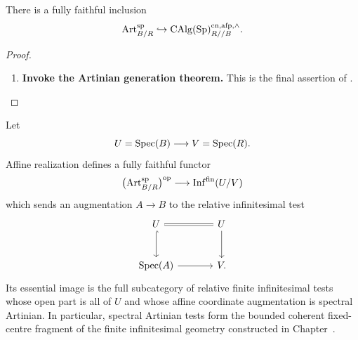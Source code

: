 \begin{corollary}
\label{cor:artinian-complete-aft}
There is a fully faithful inclusion
\[
    \operatorname{Art}^{\mathrm{sp}}_{B/R}
    \hookrightarrow
    \operatorname{CAlg}(\operatorname{Sp})^{\mathrm{cn},\mathrm{afp},\wedge}_{R//B}.
\]
\end{corollary}

\begin{proof}
\leavevmode
\begin{enumerate}[label=\textup{(\arabic*)}]
    \item \textbf{Invoke the Artinian generation theorem.}
    This is the final assertion of
    .
\end{enumerate}
\end{proof}

\begin{proposition}
\label{prop:artinian-as-finite-infinitesimal-tests}
Let
\[
    U=\operatorname{Spec}(B)\longrightarrow V=\operatorname{Spec}(R).
\]
Affine realization defines a fully faithful functor
\[
    \bigl(\operatorname{Art}^{\mathrm{sp}}_{B/R}\bigr)^{\mathrm{op}}
    \longrightarrow
    \operatorname{Inf}^{\mathrm{fin}}(U/V)
\]
which sends an augmentation \(A\to B\) to the relative infinitesimal test
\[
\begin{tikzcd}[column sep=large,row sep=large]
    U \arrow[r,equal] \arrow[d,hook]
        & U \arrow[d]
    \\
    \Spec(A) \arrow[r]
        & V.
\end{tikzcd}
\]
Its essential image is the full subcategory of relative finite infinitesimal
tests whose open part is all of \(U\) and whose affine coordinate augmentation
is spectral Artinian. In particular, spectral Artinian tests form the
bounded coherent fixed-centre fragment of the finite infinitesimal geometry
constructed in Chapter~.
\end{proposition}

